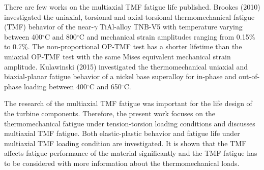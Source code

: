 There are few works on the multiaxial TMF fatigue life published.
Brookes (2010) \cite{brookes2010axial} investigated the uniaxial, torsional and axial-torsional thermomechanical fatigue (TMF) behavior of the near-$\gamma$ TiAl-alloy TNB-V5 with temperature varying between 400$^{\circ}$C and 800$^{\circ}$C and mechanical strain amplitudes ranging from 0.15\% to 0.7\%. The non-proportional OP-TMF test has a shorter lifetime than the uniaxial OP-TMF test with the same Mises equivalent mechanical strain amplitude.
Kulawinski (2015) \cite{Kulawinski201521} investigated the thermomechanical uniaxial and biaxial-planar fatigue behavior of a nickel base superalloy for in-phase and out-of-phase loading between 400$^{\circ}$C and 650$^{\circ}$C.

The research of the multiaxial TMF fatigue was important for the life design of the turbine components. Therefore, the present work focuses on the thermomechanical fatigue under tension-torsion loading conditions and discusses multiaxial TMF fatigue. Both elastic-plastic behavior and fatigue life under multiaxial TMF loading condition are investigated. It is shown that the TMF affects fatigue performance of the material significantly and the TMF fatigue has to be considered with more information about the thermomechanical loads. 





